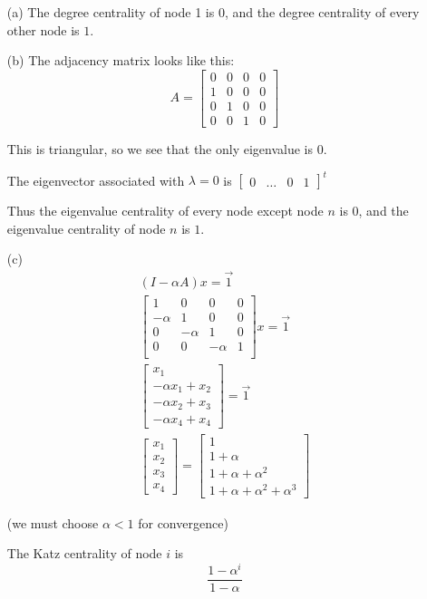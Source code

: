 \documentclass{article}
\begin{document}
\begin{enumerate}
  \item[(a)]
  The degree centrality of node 1 is \( \boxed{0} \), and the degree centrality
  of every other node is \( \boxed{1} \).

  \item[(b)]
  The adjacency matrix looks like this:
  \[
    A =
    \begin{bmatrix}
      0 & 0 & 0 & 0 \\
      1 & 0 & 0 & 0 \\
      0 & 1 & 0 & 0 \\
      0 & 0 & 1 & 0
    \end{bmatrix}
  \]

  This is triangular, so we see that the only eigenvalue is 0.

  The eigenvector associated with \( \lambda = 0 \) is \(
    \begin{bmatrix}
      0 & \dotso & 0 & 1
    \end{bmatrix}^t
  \)

  Thus the eigenvalue centrality of every node except node \( n \) is \(
  \boxed{0} \), and the eigenvalue centrality of node \( n \) is \( \boxed{1}
  \).

  \item[(c)]
  \begin{gather*}
    (I - \alpha A)x = \vec{1} \\
    \begin{bmatrix}
      1 & 0 & 0 & 0 \\
      -\alpha & 1 & 0 & 0 \\
      0 & -\alpha & 1 & 0 \\
      0 & 0 & -\alpha & 1 \\
    \end{bmatrix}
    x = \vec{1} \\
    \begin{bmatrix}
      x_1 \\
      -\alpha x_1 + x_2 \\
      -\alpha x_2 + x_3 \\
      -\alpha x_4 + x_4
    \end{bmatrix}
    = \vec{1} \\
    \begin{bmatrix}
      x_1 \\ x_2 \\ x_3 \\ x_4
    \end{bmatrix}
    =
    \begin{bmatrix}
      1 \\ 1 + \alpha \\ 1 + \alpha + \alpha^2 \\ 1 + \alpha + \alpha^2 + \alpha^3
    \end{bmatrix}
  \end{gather*}

  (we must choose \( \alpha < 1 \) for convergence)

  The Katz centrality of node \( i \) is
  \[ \boxed{
    \frac{1 - \alpha^i}{1 - \alpha}
  } \]

\end{enumerate}
\end{document}
